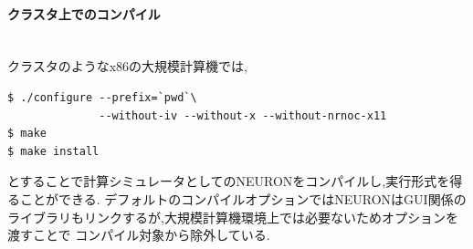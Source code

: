 \paragraph{クラスタ上でのコンパイル}~\\
クラスタのようなx86の大規模計算機では,
{\footnotesize
\begin{lstlisting}[caption=クラスタでのNEURONのコンパイル,label=cluster-neuron-compile,numbers=none]
$ ./configure --prefix=`pwd`\
              --without-iv --without-x --without-nrnoc-x11
$ make
$ make install
\end{lstlisting}
}
とすることで計算シミュレータとしてのNEURONをコンパイルし,実行形式を得ることができる.
デフォルトのコンパイルオプションではNEURONはGUI関係のライブラリもリンクするが,大規模計算機環境上では必要ないためオプションを渡すことで
コンパイル対象から除外している.\\
